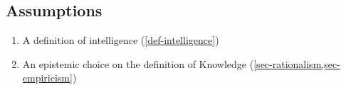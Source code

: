 \documentclass[
  letterpaper,
  DIV=11,
  numbers=noendperiod,
  oneside]{scrreprt}
\begin{document}
\hypertarget{assumptions}{%
\subsection{Assumptions}\label{assumptions}}

\begin{enumerate}
\def\labelenumi{\arabic{enumi}.}
\item
  A definition of intelligence
  (\protect\hyperlink{def-intelligence}{{[}def-intelligence{]}})
\item
  An epistemic choice on the definition of Knowledge
  (\protect\hyperlink{sec-rationalismux2csec-empiricism}{{[}sec-rationalism,sec-empiricism{]}})
\end{enumerate}
\end{document}
